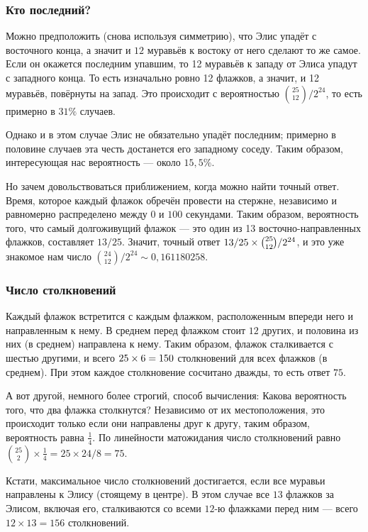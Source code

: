 \subsubsection*{Кто последний?}

Можно предположить (снова используя симметрию), что Элис упадёт с восточного конца,
а значит и $12$ муравьёв к востоку от него сделают то же самое.
Если он окажется последним упавшим, то 12 муравьёв к западу от Элиса упадут с западного конца.
То есть изначально ровно 12 флажков, а значит, и 12 муравьёв, повёрнуты на запад.
Это происходит с вероятностью $\binom{25}{12}/2^{24}$, то есть примерно в $31\%$ случаев.

Однако и в этом случае Элис не обязательно упадёт последним;
примерно в половине случаев эта честь достанется его западному соседу.
Таким образом, интересующая нас вероятность --- около $15{,}5\%$.

{\sloppy 

Но зачем довольствоваться приближением, когда можно найти точный ответ.
Время, которое каждый флажок обречён провести на стержне, независимо и равномерно распределено между $0$ и $100$ секундами.
Таким образом, вероятность того, что самый долгоживущий флажок --- это один из 13 восточно-направленных флажков, составляет $13/25$.
Значит, точный ответ $13/25 \z\times\binom{25}{12}/2^{24}$, и это уже знакомое нам число $\binom{24}{12}/2^{24}\sim 0{,}161180258$.

}

\subsubsection*{Число столкновений}

Каждый флажок встретится с каждым флажком, расположенным впереди него и направленным к нему.
В среднем перед флажком стоит $12$ других, и
половина из них (в среднем) направлена к нему.
Таким образом, флажок сталкивается с шестью другими, и всего $25 \times 6 \z= 150$ столкновений для всех флажков (в среднем).
При этом каждое столкновение сосчитано дважды, то есть ответ $75$.

А вот другой, немного более строгий, способ вычисления:
Какова вероятность того, что два флажка столкнутся?
Независимо от их местоположения, это происходит только если они направлены друг к другу,
таким образом, вероятность равна $\tfrac14$.
По линейности матожидания число столкновений равно $\binom{25}2 \times \tfrac14 = 25 \times 24 /8 = 75$.

Кстати, максимальное число столкновений достигается, если все муравьи направлены к Элису (стоящему в центре).
В этом случае все $13$ флажков за Элисом, включая его, сталкиваются со всеми $12$-ю флажками перед ним --- всего $12 \times 13 = 156$ столкновений.

